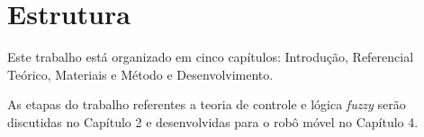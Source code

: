 \section{Estrutura}

Este trabalho está organizado em cinco capítulos: Introdução,
Referencial Teórico, Materiais e Método e Desenvolvimento. 

As etapas do trabalho referentes a teoria de controle e lógica \textit{fuzzy}
serão discutidas no Capítulo 2 e desenvolvidas para o robô móvel no Capítulo
4.
